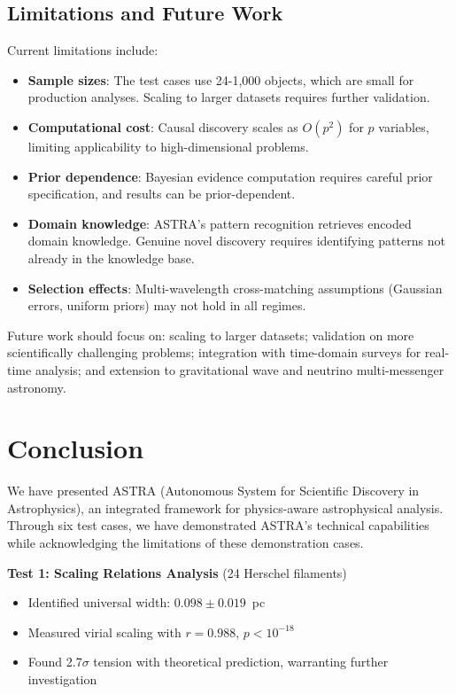\documentclass[usenatbib]{rasti}
\begin{document}
\subsection{Limitations and Future Work}

Current limitations include:
\begin{itemize}
\item \textbf{Sample sizes}: The test cases use 24-1,000 objects, which are small for production analyses. Scaling to larger datasets requires further validation.
\item \textbf{Computational cost}: Causal discovery scales as $O(p^2)$ for $p$ variables, limiting applicability to high-dimensional problems.
\item \textbf{Prior dependence}: Bayesian evidence computation requires careful prior specification, and results can be prior-dependent.
\item \textbf{Domain knowledge}: ASTRA's pattern recognition retrieves encoded domain knowledge. Genuine novel discovery requires identifying patterns not already in the knowledge base.
\item \textbf{Selection effects}: Multi-wavelength cross-matching assumptions (Gaussian errors, uniform priors) may not hold in all regimes.
\end{itemize}

Future work should focus on: scaling to larger datasets; validation on more scientifically challenging problems; integration with time-domain surveys for real-time analysis; and extension to gravitational wave and neutrino multi-messenger astronomy.

\section{Conclusion}

We have presented ASTRA (Autonomous System for Scientific Discovery in Astrophysics), an integrated framework for physics-aware astrophysical analysis. Through six test cases, we have demonstrated ASTRA's technical capabilities while acknowledging the limitations of these demonstration cases.

\textbf{Test 1: Scaling Relations Analysis} (24 Herschel filaments)
\begin{itemize}
\item Identified universal width: $0.098 \pm 0.019$~pc
\item Measured virial scaling with $r = 0.988$, $p < 10^{-18}$
\item Found 2.7$\sigma$ tension with theoretical prediction, warranting further investigation
\end{itemize}
\end{document}
